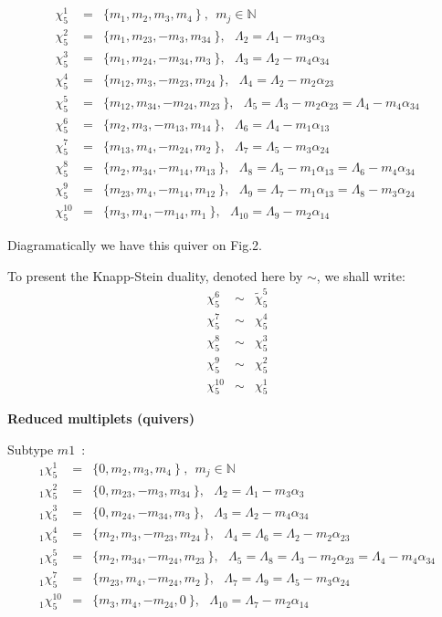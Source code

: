 \documentclass[a4paper]{jpconf}
\def\bb {\begin {eqnarray}}
\def\eqnn#1{\bb\label{#1}}
\def\eea {\end {eqnarray}}
\def\nn{\nonumber}
\def\bbn{\mathbb{N}}%
\def\a{\alpha}
\def\L{\Lambda}
\begin{document}
\eqnn{slt5}
\chi^1_5 &=& \{ m_1, m_2, m_3, m_4 \   \} \ , ~~m_j \in\bbn \\
\chi^2_5 &=& \{ m_1, m_{23}, -m_3, m_{34} \   \} , ~~~\L_2 = \L_1 - m_3 \a_3 \nn\\
\chi^3_5 &=& \{ m_{1}, m_{24}, -m_{34}, m_{3} \   \} , ~~~\L_3 = \L_2 - m_4 \a_{34} \nn\\
\chi^4_5 &=& \{ m_{12}, m_{3}, -m_{23}, m_{24} \   \} , ~~~\L_4 = \L_2 - m_2 \a_{23} \nn\\
\chi^5_5 &=& \{ m_{12}, m_{34}, -m_{24}, m_{23} \   \} , ~~~\L_5 = \L_3 - m_2 \a_{23} = \L_4 - m_4 \a_{34} \nn\\
\chi^6_5 &=& \{ m_{2}, m_{3}, -m_{13}, m_{14} \   \} , ~~~\L_6 = \L_4 - m_1 \a_{13} \nn\\
\chi^7_5 &=& \{ m_{13}, m_{4}, -m_{24}, m_{2} \   \} , ~~~\L_7 = \L_5 - m_3 \a_{24} \nn\\
\chi^8_5 &=& \{ m_{2}, m_{34}, -m_{14}, m_{13} \   \} , ~~~\L_8 = \L_5 - m_1 \a_{13} = \L_6 - m_4 \a_{34}\nn\\
\chi^9_5 &=& \{ m_{23}, m_{4}, -m_{14}, m_{12} \   \} , ~~~\L_9 = \L_7 - m_1 \a_{13} = \L_8 - m_3 \a_{24} \nn\\
\chi^{10}_5 &=& \{ m_{3}, m_{4}, -m_{14}, m_{1} \   \} , ~~~\L_{10} = \L_9 - m_2 \a_{14} \nn\eea

Diagramatically we have this quiver on Fig.2.


To present the Knapp-Stein duality, denoted here by $\sim$, we shall write:
\eqnn{slt5d} \chi^6_5 &\sim& \tilde{\chi}^5_5 \\
\chi^7_5 &\sim&  {\chi}^4_5 \nn\\
\chi^8_5 &\sim&  {\chi}^3_5 \nn\\
\chi^9_5 &\sim&  {\chi}^2_5 \nn\\
\chi^{10}_5 &\sim&  {\chi}^1_5 \nn\eea



{\bf Reduced multiplets (quivers)}

Subtype $m1$~:
\eqnn{slt51}
_1\chi^1_5 &=& \{ 0, m_2, m_3, m_4 \   \} \ ,  ~~m_j \in\bbn \\
_1\chi^2_5 &=& \{ 0, m_{23}, -m_3, m_{34} \   \} , ~~~\L_2  = \L_1 - m_3 \a_3 \nn\\
_1\chi^3_5 &=& \{ 0, m_{24}, -m_{34}, m_{3} \   \} , ~~~\L_3 = \L_2 - m_4 \a_{34} \nn\\
_1\chi^4_5 &=& \{ m_{2}, m_{3}, -m_{23}, m_{24} \   \} , ~~~\L_4 = \L_6 = \L_2 - m_2 \a_{23} \nn\\
_1\chi^5_5 &=& \{ m_{2}, m_{34}, -m_{24}, m_{23} \   \} , ~~~\L_5 = \L_8 = \L_3 - m_2 \a_{23} = \L_4 - m_4 \a_{34} \nn\\
_1\chi^7_5 &=& \{ m_{23}, m_{4}, -m_{24}, m_{2} \   \} ,  ~~~\L_7   = \L_9 = \L_5 - m_3 \a_{24} \nn\\
_1\chi^{10}_5 &=& \{ m_{3}, m_{4}, -m_{24}, 0 \   \} , ~~~\L_{10} = \L_7 - m_2 \a_{14} \nn\eea
\end{document}
